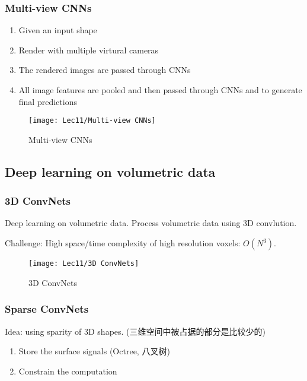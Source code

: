 \subsubsection{Multi-view CNNs}
\begin{enumerate}
    \item Given an input shape
    \item Render with multiple virtural cameras
    \item The rendered images are passed through CNNs
    \item All image features are pooled and then passed through CNNs
    and to generate final predictions
\end{enumerate}

\begin{figure}[H]
    \centering
    \texttt{[image: Lec11/Multi-view CNNs]}
    \caption{Multi-view CNNs}
\end{figure}

\subsection{Deep learning on volumetric data}

\subsubsection{3D ConvNets}
Deep learning on volumetric data. Process volumetric data using 3D convlution. 

Challenge: High space/time complexity of high resolution voxels: $O(N^3 )$.

\begin{figure}[H]
    \centering
    \texttt{[image: Lec11/3D ConvNets]}
    \caption{3D ConvNets}
\end{figure}

\subsubsection{Sparse ConvNets}
Idea: using sparity of 3D shapes. (三维空间中被占据的部分是比较少的)

\begin{enumerate}
    \item Store the  surface signals (Octree, 八叉树)
    \item Constrain the computation 
\end{enumerate}

